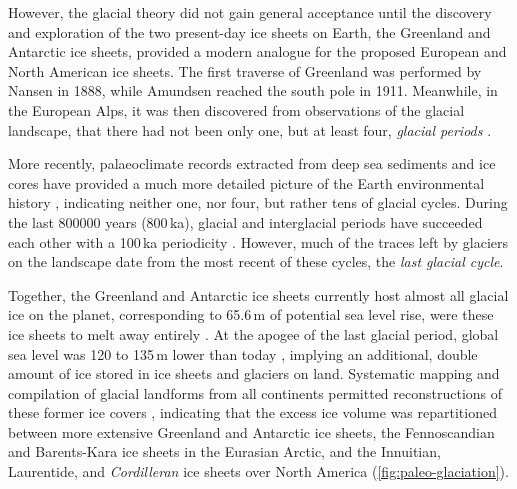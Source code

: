 \documentclass{article}
\begin{document}
However, the glacial theory did not gain general acceptance until the
discovery and exploration
of the two present-day ice sheets on Earth, the Greenland and
Antarctic ice sheets, provided a modern analogue for the proposed European and
North American ice sheets. The first traverse of Greenland was performed by
Nansen in 1888, while Amundsen reached the south pole in 1911. Meanwhile, in
the European Alps, it was then discovered from observations of the glacial
landscape, that there had not been only one, but at least four, \emph{glacial
periods} \citep{Penck.Bruckner.1909}.

More recently, palaeoclimate records extracted from deep sea sediments and ice
cores have provided a much more detailed picture of the Earth environmental
history \citep[e.g.,][]{Emiliani.1955, Shackleton.Opdyke.1973,
Dansgaard.etal.1993, Augustin.etal.2004}, indicating neither one, nor four, but
rather tens of glacial cycles. During the last 800000 years (800\,ka), glacial
and interglacial periods have succeeded each other with a 100\,ka periodicity
\citep[\cref{fig:paleo-timeseries};]{Hays.etal.1976, Augustin.etal.2004}.
However, much of the traces left by glaciers on the landscape date from the
most recent of these cycles, the \emph{last glacial cycle}.

Together, the Greenland and Antarctic ice sheets currently host almost all
glacial ice on the planet, corresponding to 65.6\,m of potential sea level
rise, were these ice sheets to melt away entirely \citep{Bamber.etal.2013,
Fretwell.etal.2013}. At the apogee of the last glacial period, global sea level
was 120 to 135\,m lower than today
\citep{Clark.Mix.2002}, implying an additional, double amount of ice stored in
ice sheets and glaciers on land. Systematic mapping and compilation of glacial
landforms from all continents \citep[e.g.,][]{Prest.etal.1968,
Boulton.Clark.1990, Kleman.etal.1997, Hattestrand.1998} permitted
reconstructions of these former ice covers \citep{Ehlers.Gibbard.2007},
indicating that the excess ice volume
was repartitioned between more extensive Greenland and Antarctic ice sheets,
the Fennoscandian and Barents-Kara ice sheets in the Eurasian Arctic, and the
Innuitian, Laurentide, and \emph{Cordilleran} ice
sheets over North America (\cref{fig:paleo-glaciation}).
\end{document}

